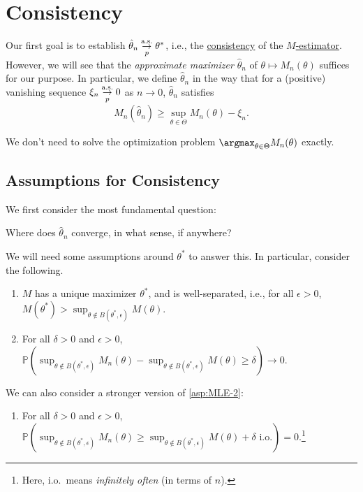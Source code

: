 \section{Consistency}
Our first goal is to establish \(\hat{\theta} _n \overunderset{\text{a.s.}}{p}{\to } \theta ^{\ast} \), i.e., the \hyperref[def:consistent]{consistency} of the \hyperref[def:M-estimator]{\(M\)-estimator}. However, we will see that the \emph{approximate maximizer} \(\hat{\theta} _n\) of \(\theta \mapsto M_n(\theta )\) suffices for our purpose. In particular, we define \(\hat{\theta} _n\) in the way that for a (positive) vanishing sequence \(\xi _n \overunderset{\text{a.s.}}{p}{\to } 0\) as \(n \to 0\), \(\hat{\theta} _n\) satisfies
\begin{equation}\label{eq:approximate-M-estimator}
	M_n(\hat{\theta} _n)
	\geq \sup _{\theta \in \Theta } M_n(\theta ) - \xi _n.
\end{equation}

\begin{intuition}
	We don't need to solve the optimization problem \(\argmax_{\theta \in \Theta } M_n(\theta )\) exactly.
\end{intuition}

\subsection{Assumptions for Consistency}
We first consider the most fundamental question:

\begin{problem*}
	Where does \(\hat{\theta} _n\) converge, in what sense, if anywhere?
\end{problem*}

We will need some assumptions around \(\theta ^{\ast} \) to answer this. In particular, consider the following.

\begin{enumerate}[label=(A\arabic*)]
	\item\label{asp:MLE-1} \(M\) has a unique maximizer \(\theta ^{\ast} \), and is well-separated, i.e., for all \(\epsilon > 0\), \(M(\theta ^{\ast} ) > \sup _{\theta \notin B(\theta ^{\ast} , \epsilon )} M(\theta )\).
	\item\label{asp:MLE-2} For all \(\delta > 0\) and \(\epsilon > 0\), \(\mathbb{P} ( \sup _{\theta \notin B(\theta ^{\ast} , \epsilon )} M_n(\theta ) - \sup _{\theta \notin B(\theta ^{\ast} , \epsilon )} M(\theta ) \geq \delta ) \to 0\).
\end{enumerate}
We can also consider a stronger version of \autoref{asp:MLE-2}:
\begin{enumerate}[resume, label=(A\arabic*)]
	\item\label{asp:MLE-3} For all \(\delta > 0\) and \(\epsilon > 0\), \(\mathbb{P} ( \sup _{\theta \notin B(\theta ^{\ast} , \epsilon )} M_n(\theta ) \geq \sup _{\theta \notin B(\theta ^{\ast} , \epsilon )} M(\theta ) + \delta \text{ i.o.} ) = 0\).\footnote{Here, i.o.\ means \emph{infinitely often} (in terms of \(n\)).}
\end{enumerate}

